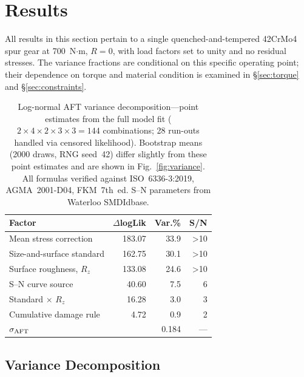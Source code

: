 \documentclass[12pt,a4paper]{article}
\begin{document}
\section{Results}
\label{sec:results}

All results in this section pertain to a single quenched-and-tempered
42CrMo4 spur gear at 700~N$\cdot$m, $R=0$, with load factors set to
unity and no residual stresses. The variance fractions are conditional
on this specific operating point; their dependence on torque and
material condition is examined in \S\ref{sec:torque} and
\S\ref{sec:constraints}.

\begin{table}[h]
\centering
\caption{Log-normal AFT variance decomposition---point estimates from the
full model fit ($2\times4\times2\times3\times3 = 144$ combinations;
28 run-outs handled via censored likelihood). Bootstrap means
(2000 draws, RNG seed~42) differ slightly from these point estimates
and are shown in Fig.~\ref{fig:variance}.%
All formulas verified against ISO~6336-3:2019, AGMA~2001-D04, FKM~7th~ed.
S--N parameters from Waterloo SMDIdbase.}
\label{tab:anova}
\begin{tabular}{lrrr}
\toprule
Factor & $\Delta$logLik & Var.\% & S/N \\
\midrule
Mean stress correction      & 183.07 & 33.9 & >10 \\
Size-and-surface standard   & 162.75 & 30.1 & >10 \\
Surface roughness, $R_z$    & 133.08 & 24.6 & >10 \\
S--N curve source           &  40.60 &  7.5 &  ~6 \\
Standard $\times$ $R_z$     &  16.28 &  3.0 &  ~3 \\
Cumulative damage rule      &   4.72 &  0.9 &  ~2 \\
\midrule
$\sigma_{\rm AFT}$          &        & 0.184 & --- \\
\bottomrule
\end{tabular}
\end{table}

\subsection{Variance Decomposition}
\end{document}
